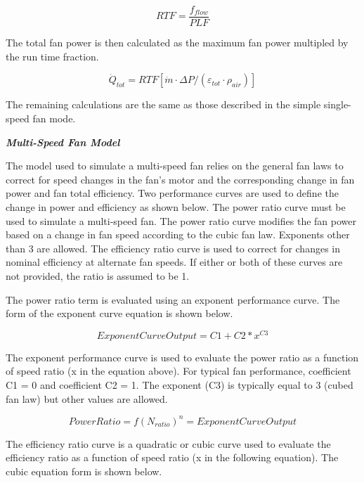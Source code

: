 \begin{equation}
  RTF = \frac{f_{flow}}{PLF}
\end{equation}

The total fan power is then calculated as the maximum fan power multipled by the run time fraction.

\begin{equation}
{\dot{Q}_{tot}} = RTF\left[ {\dot{m} \cdot \Delta P/\left( {{\varepsilon_{tot}}\cdot {\rho_{air}}} \right)} \right]
\end{equation}

The remaining calculations are the same as those described in the simple single-speed fan mode.

\emph{\textbf{Multi-Speed Fan Model}}

The model used to simulate a multi-speed fan relies on the general fan laws to correct for speed changes in the fan's motor and the corresponding change in fan power and fan total efficiency. Two performance curves are used to define the change in power and efficiency as shown below. The power ratio curve must be used to simulate a multi-speed fan. The power ratio curve modifies the fan power based on a change in fan speed according to the cubic fan law. Exponents other than 3 are allowed. The efficiency ratio curve is used to correct for changes in nominal efficiency at alternate fan speeds. If either or both of these curves are not provided, the ratio is assumed to be 1.

The power ratio term is evaluated using an exponent performance curve. The form of the exponent curve equation is shown below.

\begin{equation}
ExponentCurveOutput = C1 + C2*{x^{C3}}
\end{equation}

The exponent performance curve is used to evaluate the power ratio as a function of speed ratio (x in the equation above). For typical fan performance, coefficient C1 = 0 and coefficient C2 = 1. The exponent (C3) is typically equal to 3 (cubed fan law) but other values are allowed.

\begin{equation}
PowerRatio = f{\left( {{N_{ratio}}} \right)^n} = ExponentCurveOutput
\end{equation}

The efficiency ratio curve is a quadratic or cubic curve used to evaluate the efficiency ratio as a function of speed ratio (x in the following equation). The cubic equation form is shown below.

